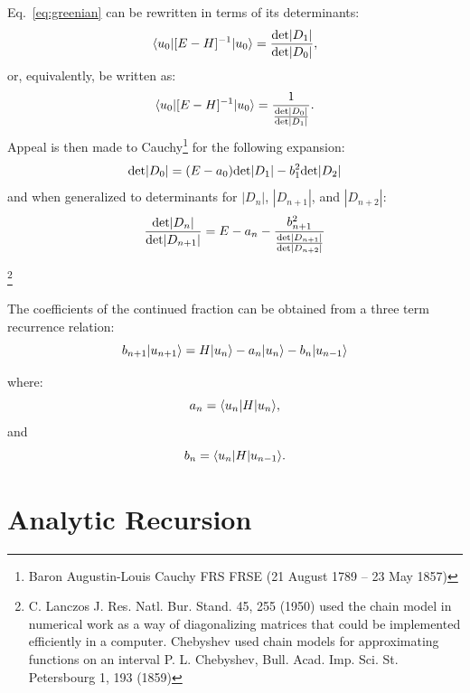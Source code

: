 Eq.~\ref{eq:greenian} can be rewritten in terms of its determinants:
%
\begin{equation}
\label{eq:greendet}
\langle u_{0}|[E-H]^{-1}|u_{0}\rangle = \frac{{\rm det}|D_{1}|}{{\rm det}|D_{0}|},
\end{equation}
%
or, equivalently, be written as:
%
\begin{equation}
\label{eq:greendet}
\langle u_{0}|[E-H]^{-1}|u_{0}\rangle = \frac{1}{\frac{{\rm det}|D_{0}|}{{\rm det}|D_{1}|}}.
\end{equation}
%
Appeal is then made to Cauchy\footnote{Baron Augustin-Louis Cauchy FRS FRSE (21 August 1789 – 23 May 1857)} 
for the following expansion:
%
\begin{equation}
\label{eq:cauchy}
{\rm det}|D_{0}| = (E-a_{0}){\rm det}|D_{1}|-b^{2}_{1}{\rm det}|D_{2}|
\end{equation}
%
and when generalized to determinants for $|D_{n}|$, $|D_{n+1}|$, and $|D_{n+2}|$:
%
\begin{equation}
\frac{{\rm det}|D_{n}|}{{\rm det}|D_{n+1}|} = E-a_{n}-\frac{b^{2}_{n+1}}{\frac{{\rm det}|D_{n+1}|}{{\rm det}|D_{n+2}|}}
\end{equation}

\footnote{
C. Lanczos J. Res. Natl. Bur. Stand. 45, 255 (1950) 
used the chain model in numerical work as a way of diagonalizing matrices
that could be implemented efficiently in a computer.
Chebyshev used chain models for approximating functions on an interval
P. L. Chebyshev, Bull. Acad. Imp. Sci. St. Petersbourg 1, 193 (1859)}

The coefficients of the continued fraction can be obtained from
a three term recurrence relation:
%
\begin{equation}
b_{n+1}|u_{n+1}\rangle = H |u_{n}\rangle - a_{n}|u_{n}\rangle - b_{n}|u_{n-1}\rangle
\end{equation}

where:
\begin{equation}
a_{n} = \langle u_{n}|H|u_{n} \rangle,
\end{equation}
and 
\begin{equation}
b_{n} = \langle u_{n}|H|u_{n-1} \rangle.
\end{equation}

\section{Analytic Recursion}
